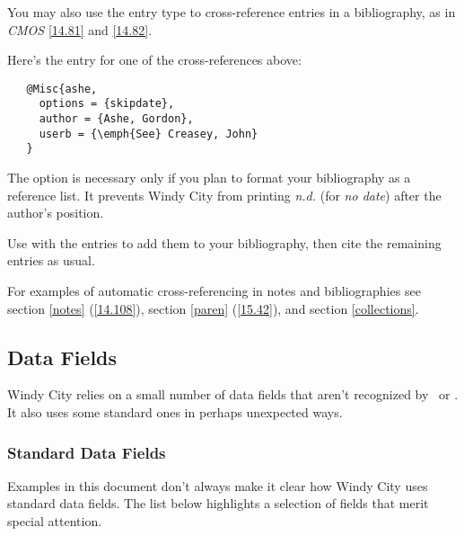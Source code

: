 \documentclass[11pt,letterpaper,oneside]{article}
\begin{document}
You may also use the  entry type to cross-reference
entries in a bibliography, as in \textit{CMOS} \ref{14.81} and
\ref{14.82}.

\begin{bibonly}
\nocite{ashe,creasey1976,creasey1978,creasey1966,morton,york}
\end{bibonly}

\noindent Here's the  entry for one of the
cross-references above:

\begin{verbatim}
   @Misc{ashe,
     options = {skipdate},
     author = {Ashe, Gordon},
     userb = {\emph{See} Creasey, John}
   }
\end{verbatim}

\noindent The option  is necessary only if you plan to
format your bibliography as a reference list. It prevents Windy City
from printing \textit{n.d.} (for \textit{no date}) after the author's
position.

Use  with the  entries to add them to your
bibliography, then cite the remaining entries as usual.

For examples of automatic cross-referencing in notes and
bibliographies see section \ref{notes} (\ref{14.108}), section
\ref{paren} (\ref{15.42}), and section \ref{collections}.

\subsection{Data Fields}
\label{datafields}

Windy City relies on a small number of data fields that aren't
recognized by \BibTeX\ or \biblatex. It also uses some standard ones
in perhaps unexpected ways.

\subsubsection{Standard Data Fields}
\label{stdfields}

Examples in this document don't always make it clear how Windy City
uses standard data fields. The list below highlights a selection of
fields that merit special attention.
\end{document}
